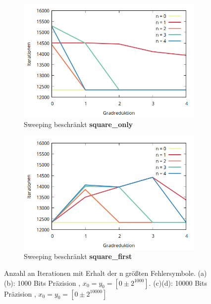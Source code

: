 \begin{figure}[tbh]
\begin{subfigure}{.5\textwidth}
  \centering
  \includegraphics[width=\linewidth]{img/sweeping_only10k.png}
  \caption{Sweeping beschränkt \textbf{square\_only}}  
  \label{fig:sub1}
\end{subfigure}%
\begin{subfigure}{.5\textwidth}
  \centering
  \includegraphics[width=\linewidth]{img/sweeping_first10k.png}
 \caption{Sweeping beschränkt \textbf{square\_first}}
  \label{fig:sub2}
\end{subfigure}
\caption[Sweeping mit verschiedenen Graden]{Anzahl an Iterationen mit Erhalt der n größten Fehlersymbole. (a) (b): 1000 Bits Präzision , $x_0 = y_0 = [0 \pm 2^{1000}]$.
 (c)(d): 10000 Bits Präzision , $x_0 = y_0 = [0 \pm 2^{10000}]$
}
\label{fig:sweeping}
\end{figure}


